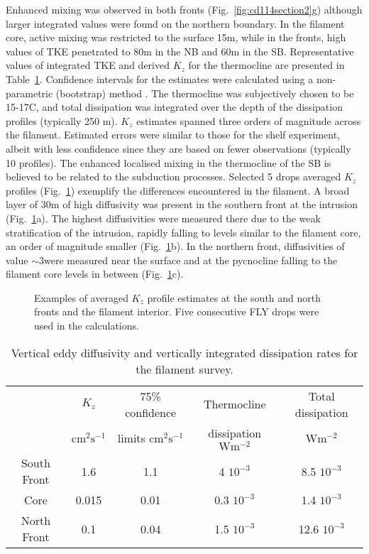 Enhanced mixing was observed in both fronts
(Fig.~\ref{fig:cd114section2}g) although larger integrated values
were found on the northern boundary. In the filament core, active
mixing was restricted to the surface 15m, while in the fronts,
high values of TKE penetrated to 80m in the NB and 60m in the SB.
Representative values of integrated TKE and derived $K_z$ for the
thermocline are presented in Table~\ref{tb:cd114mixing}.
Confidence intervals for the estimates were calculated using a
non-parametric (bootstrap) method \citep{Press92}. The thermocline
was subjectively chosen to be 15-17\deg C, and total dissipation
was integrated over the depth of the dissipation profiles
(typically 250 m). $K_z$ estimates spanned three orders of
magnitude across the filament. Estimated errors were similar to
those for the shelf experiment, albeit with less confidence since
they are based on fewer observations (typically 10 profiles). The
enhanced localised mixing in the thermocline of the SB is believed
to be related to the subduction processes. Selected 5 drops
averaged $K_z$ profiles (Fig.~\ref{fig:cd114flydrops}) exemplify
the differences encountered in the filament. A broad layer of 30m
of high diffusivity was present in the southern front at the
intrusion (Fig.~\ref{fig:cd114flydrops}a). The highest
diffusivities were measured there due to the weak stratification
of the intrusion, rapidly falling to levels similar to the
filament core, an order of magnitude smaller
(Fig.~\ref{fig:cd114flydrops}b). In the northern front,
diffusivities of value $\sim$3\mixc were measured near the surface
and at the pycnocline falling to the filament core levels in
between (Fig.~\ref{fig:cd114flydrops}c).

\begin{figure}
\centering %
%
%
%
\caption{Examples of averaged $K_z$ profile estimates at the south
and north fronts and the filament interior. Five consecutive FLY
drops were used in the calculations.} \label{fig:cd114flydrops}
\end{figure}
\begin{table}[h]
  \centering
\begin{tabular}{ccccc}
 & $K_z$  & 75\% confidence & Thermocline  & Total dissipation  \\
 & $\mathrm{cm^2 s^{-1}}$  &  limits $\mathrm{cm^2 s^{-1}}$ &
 dissipation $\mathrm{W m^{-2}}$  & $\mathrm{W m^{-2}}$ \\
\hline \hline
South Front & 1.6 & 1.1 & 4 $10^{-3}$ & 8.5 $10^{-3}$  \\
Core & 0.015 & 0.01  & 0.3 $10^{-3}$ & 1.4 $10^{-3}$ \\
  North Front & 0.1 & 0.04 & 1.5 $10^{-3}$ & 12.6 $10^{-3}$ \\
\hline \hline
\end{tabular}  \caption{Vertical eddy diffusivity and vertically integrated
dissipation rates for the filament survey. }\label{tb:cd114mixing}
\end{table}

